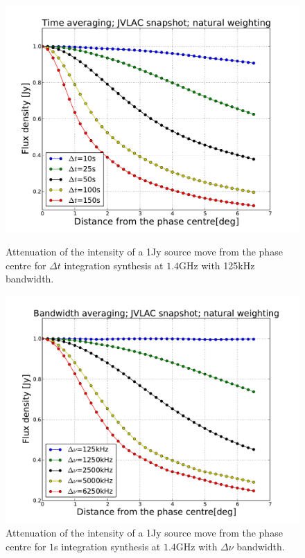\documentclass[useAMS,usenatbib]{mn2e}
\begin{document}
\begin{figure}
  \centering
  \begin{minipage}{0.38\linewidth}\includegraphics[width=1\textwidth]{./Figures/effect_time_averaging.pdf}\caption{Attenuation of the 
intensity of a 1Jy source move from the phase centre for $\Delta t$ integration synthesis at $1.4$GHz with
125kHz bandwidth.}\label{timessear1}\end{minipage}
\hspace{1cm}
\begin{minipage}{0.38\linewidth}\includegraphics[width=1\textwidth]{./Figures/effect_bandwid_averaging.pdf}\caption{Attenuation of the 
intensity of a 1Jy source move from the phase centre for $1$s integration synthesis at $1.4$GHz with
$\Delta \nu$ bandwidth.}\label{timessear2}\end{minipage}
\end{figure}
\end{document}
